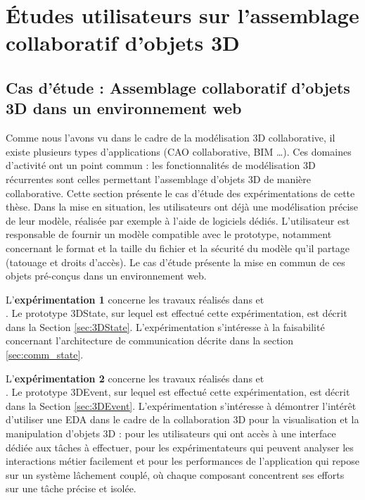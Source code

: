 \chapter{Études utilisateurs sur l'assemblage collaboratif 
d'objets 3D}
\label{sec:chap:expe}
\chaptertable

\section{Cas d'étude : Assemblage collaboratif d'objets 3D dans un 
environnement web}
\label{sec:use_case}
Comme nous l'avons vu dans le cadre de la modélisation \gls{3D} collaborative, il 
existe plusieurs types d'applications (\gls{CAO} collaborative, \gls{BIM} \dots). 
Ces domaines d'activité ont un point commun : les fonctionnalités de 
modélisation \gls{3D} récurrentes sont celles permettant l'assemblage d'objets 
\gls{3D} de manière collaborative. Cette section présente le cas d'étude des 
expérimentations de cette thèse. Dans la mise en situation, les utilisateurs ont 
déjà une modélisation précise de leur modèle,  
réalisée par exemple à l'aide de logiciels dédiés. L'utilisateur est responsable de 
fournir un modèle compatible avec le prototype, notamment concernant le format 
et la taille du fichier et la sécurité du modèle qu'il partage (tatouage et droits 
d'accès). Le cas d'étude présente la mise en commun de ces objets pré-conçus 
dans un environnement web.

L'\textbf{expérimentation 1} concerne les travaux réalisés dans 
\cite{Desprat2015a} et \\ \cite{Desprat2015b}. Le prototype 3DState, sur lequel est 
effectué cette 
expérimentation, est décrit dans la Section \ref{sec:3DState}. L'expérimentation 
s'intéresse à la faisabilité concernant l'architecture 
de communication décrite dans la section \ref{sec:comm_state}. 

 
L'\textbf{expérimentation 2} concerne les travaux réalisés dans 
\cite{Desprat2016} et  \\ 
\cite{Desprat2017}. Le prototype 3DEvent, sur lequel est effectué cette 
expérimentation, est décrit dans la Section \ref{sec:3DEvent}. L'expérimentation 
s'intéresse à démontrer l'intérêt d'utiliser une \gls{EDA} dans le cadre de la 
collaboration 3D pour la visualisation et la manipulation d'objets \gls{3D} : pour les 
utilisateurs qui ont accès à une interface dédiée aux tâches à effectuer, pour les 
expérimentateurs qui peuvent analyser les interactions métier facilement et pour 
les performances de l'application qui repose sur un système lâchement couplé, 
où chaque composant concentrent ses efforts sur une tâche précise et isolée. 

